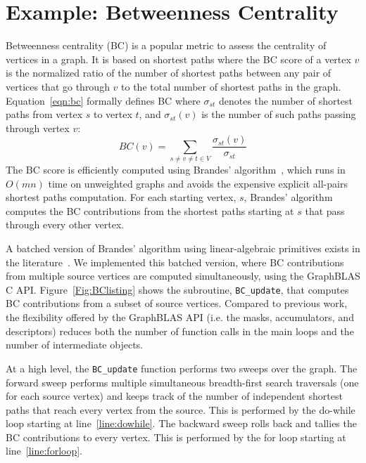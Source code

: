 \section{Example: Betweenness Centrality}
\label{sec:example}

Betweenness centrality (BC) is a popular metric to assess the centrality of 
vertices in a graph. It is based on shortest paths where the BC score of a
vertex $v$ is the normalized ratio of the number of shortest paths between 
any pair of vertices that go through $v$ to the total number of shortest paths 
in the graph.  Equation~\ref{eqn:bc} formally defines BC where $\sigma_{st}$ 
denotes the number of shortest paths from vertex $s$ to vertex $t$, and 
$\sigma_{st}(v)$ is the number of such paths passing through vertex $v$:
\begin{equation}
	BC(v) = \sum_{s \neq v \neq t \in V} \frac{\sigma_{st}(v)}{\sigma_{st}}
\label{eqn:bc}
\end{equation}
The BC score is efficiently computed using Brandes' 
algorithm~\cite{brandes2001faster}, 
which runs in $O(mn)$ time on unweighted graphs and avoids the expensive 
explicit all-pairs shortest paths computation.  For each starting vertex, $s$, 
Brandes' algorithm computes the BC contributions from the shortest paths starting
at $s$ that pass through every other vertex.

A batched version of Brandes' algorithm using linear-algebraic primitives
exists in the literature~\cite{combblas,bader2006designing,robinson2011complex}. 
We implemented this batched version, where BC contributions from multiple 
source vertices are computed simultaneously, using the GraphBLAS C API. 
Figure~\ref{Fig:BClisting} shows the subroutine, {\tt BC\_update}, that computes
BC contributions from a subset of source vertices. Compared to previous work, the 
flexibility offered by the GraphBLAS API (i.e. the masks, accumulators, 
and descriptors) reduces both the number of function calls in the main loops and the
number of intermediate objects.

At a high level, the {\tt BC\_update} function performs two sweeps over the 
graph. The forward sweep performs multiple simultaneous
breadth-first search traversals (one for each source vertex) and keeps track 
of the number of independent shortest paths that reach every vertex from 
the source.  This is performed by the do-while loop starting at 
line~\ref{line:dowhile}. The backward sweep rolls back and tallies the BC 
contributions to every vertex. This is performed by the for loop starting 
at line~\ref{line:forloop}.  

